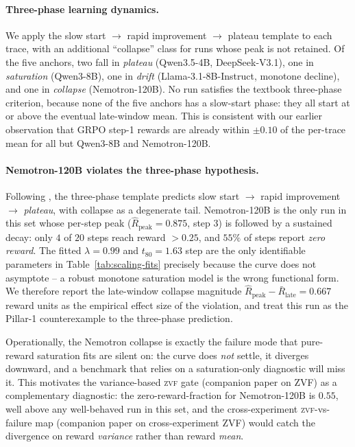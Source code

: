 \documentclass{article}
\begin{document}
\paragraph{Three-phase learning dynamics.}
\label{par:three-phase}
We apply the \citet{nimmaturi2025predictive} slow start
$\to$ rapid improvement $\to$ plateau template to each trace, with
an additional ``collapse'' class for runs whose peak is not
retained.  Of the five anchors, two fall in \emph{plateau}
(Qwen3.5-4B, DeepSeek-V3.1), one in \emph{saturation} (Qwen3-8B),
one in \emph{drift} (Llama-3.1-8B-Instruct, monotone decline), and
one in \emph{collapse} (Nemotron-120B).  No run satisfies the
textbook three-phase criterion, because none of the five anchors
has a slow-start phase: they all start at or above the eventual
late-window mean.  This is consistent with our earlier
observation that GRPO step-1 rewards are already within
$\pm 0.10$ of the per-trace mean for all but Qwen3-8B and
Nemotron-120B.

\paragraph{Nemotron-120B violates the three-phase hypothesis.}
\label{par:nemotron-collapse}
Following \citet{nimmaturi2025predictive}, the three-phase
template predicts slow start $\to$ rapid improvement $\to$
\emph{plateau}, with collapse as a degenerate tail.  Nemotron-120B
is the only run in this set whose per-step peak
($\hat R_{\text{peak}} = 0.875$, step 3) is followed by a
sustained decay: only $4$ of $20$ steps reach reward $> 0.25$, and
$55\%$ of steps report \emph{zero reward}.  The fitted $\lambda
= 0.99$ and $t_{80} = 1.63$ step are the only identifiable
parameters in Table~\ref{tab:scaling-fits} precisely because the
curve does not asymptote -- a robust monotone saturation model is
the wrong functional form.  We therefore report the late-window
collapse magnitude
$\hat R_{\text{peak}} - \bar R_{\text{late}} = 0.667$ reward units
as the empirical effect size of the violation, and treat this run
as the Pillar-1 counterexample to the three-phase prediction.

Operationally, the Nemotron collapse is exactly the failure mode
that pure-reward saturation fits are silent on: the curve does
\emph{not} settle, it diverges downward, and a benchmark that
relies on a saturation-only diagnostic will miss it.  This
motivates the variance-based \textsc{zvf} gate
(companion paper on ZVF) as a complementary diagnostic: the
zero-reward-fraction for Nemotron-120B is $0.55$, well above any
well-behaved run in this set, and the cross-experiment
\textsc{zvf}-vs-failure map
(companion paper on cross-experiment ZVF) would catch the divergence on
reward \emph{variance} rather than reward \emph{mean}.
\end{document}
